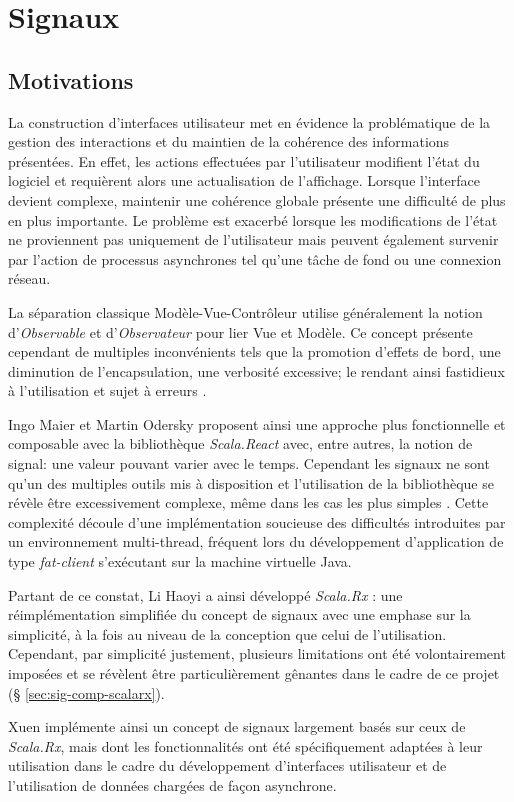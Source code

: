 \chapter{Signaux}

\section{Motivations}

La construction d'interfaces utilisateur met en évidence la problématique de la gestion des interactions et du maintien de la cohérence des informations présentées. En effet, les actions effectuées par l'utilisateur modifient l'état du logiciel et requièrent alors une actualisation de l'affichage. Lorsque l'interface devient complexe, maintenir une cohérence globale présente une difficulté de plus en plus importante. Le problème est exacerbé lorsque les modifications de l'état ne proviennent pas uniquement de l'utilisateur mais peuvent également survenir par l'action de processus asynchrones tel qu'une tâche de fond ou une connexion réseau.

La séparation classique Modèle-Vue-Contrôleur utilise généralement la notion d'\emph{Observable} et d'\emph{Observateur} pour lier Vue et Modèle. Ce concept présente cependant de multiples inconvénients tels que la promotion d'effets de bord, une diminution de l'encapsulation, une verbosité excessive; le rendant ainsi fastidieux à l'utilisation et sujet à erreurs \cite{odersky2012}.

Ingo Maier et Martin Odersky proposent ainsi une approche plus fonctionnelle et composable avec la bibliothèque \emph{Scala.React} \cite{scala-react} avec, entre autres, la notion de signal: une valeur pouvant varier avec le temps. Cependant les signaux ne sont qu'un des multiples outils mis à disposition et l'utilisation de la bibliothèque se révèle être excessivement complexe, même dans les cas les plus simples \cite[\small Related~Work]{scala.rx}. Cette complexité découle d'une implémentation soucieuse des difficultés introduites par un environnement multi-thread, fréquent lors du développement d'application de type \emph{fat-client} s'exécutant sur la machine virtuelle Java.

Partant de ce constat, Li Haoyi a ainsi développé \emph{Scala.Rx} \cite{scala.rx}: une réimplémentation simplifiée du concept de signaux avec une emphase sur la simplicité, à la fois au niveau de la conception que celui de l'utilisation. Cependant, par simplicité justement, plusieurs limitations ont été volontairement imposées et se révèlent être particulièrement gênantes dans le cadre de ce projet (§ \ref{sec:sig-comp-scalarx}).

Xuen implémente ainsi un concept de signaux largement basés sur ceux de \emph{Scala.Rx}, mais dont les fonctionnalités ont été spécifiquement adaptées à leur utilisation dans le cadre du développement d'interfaces utilisateur et de l'utilisation de données chargées de façon asynchrone.






